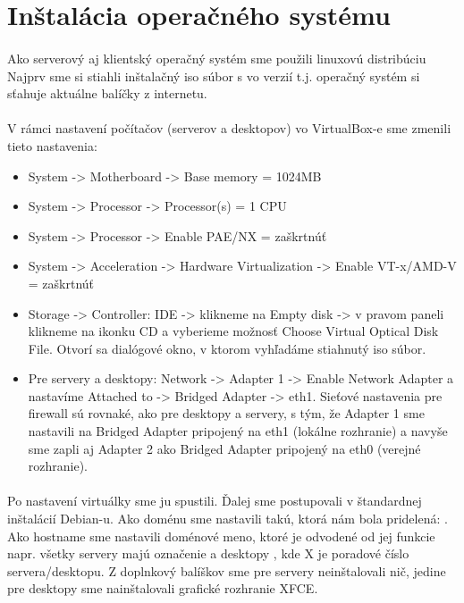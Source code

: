 \section{Inštalácia operačného systému}
\paragraph{}
Ako serverový aj klientský operačný systém sme použili linuxovú distribúciu Najprv sme si stiahli inštalačný iso súbor s  vo verzií  t.j. operačný systém si sťahuje aktuálne balíčky z internetu.
\paragraph{}
V rámci nastavení počítačov (serverov a desktopov) vo VirtualBox-e sme zmenili tieto nastavenia:
\begin{itemize}
\item System -\textgreater{} Motherboard -\textgreater{} Base memory = 1024MB
\item System -\textgreater{} Processor -\textgreater{} Processor(s) = 1 CPU
\item System -\textgreater{} Processor -\textgreater{} Enable PAE/NX = zaškrtnúť
\item System -\textgreater{} Acceleration -\textgreater{} Hardware Virtualization -\textgreater{} Enable VT-x/AMD-V = zaškrtnúť
\item Storage -\textgreater{} Controller: IDE -\textgreater{} klikneme na Empty disk -\textgreater{} v pravom paneli klikneme na ikonku CD a vyberieme možnosť Choose Virtual Optical Disk File. Otvorí sa dialógové okno, v ktorom vyhľadáme stiahnutý iso súbor.
\item Pre servery a desktopy: Network -\textgreater{} Adapter 1 -\textgreater{} Enable Network Adapter a nastavíme Attached to -\textgreater{} Bridged Adapter -\textgreater{} eth1. Sieťové nastavenia pre firewall sú rovnaké, ako pre desktopy a servery, s tým, že Adapter 1 sme nastavili na Bridged Adapter pripojený na eth1 (lokálne rozhranie) a navyše sme zapli aj Adapter 2 ako Bridged Adapter pripojený na eth0 (verejné rozhranie).
\end{itemize}

\paragraph{}
Po nastavení virtuálky sme ju spustili. Ďalej sme postupovali v štandardnej inštalá\-cií Debian-u. Ako doménu sme nastavili takú, ktorá nám bola pridelená: . Ako hostname sme nastavili doménové meno, ktoré je odvodené od jej funkcie napr. všetky servery majú označenie  a desktopy , kde X je poradové číslo servera/desktopu. Z doplnkový balíškov sme pre servery neinštalovali nič, jedine pre desktopy sme nainštalovali grafické rozhranie XFCE.

